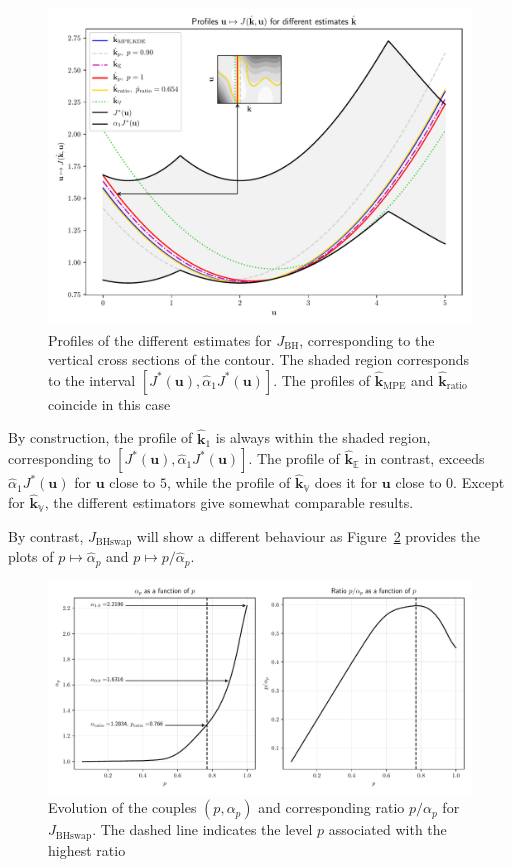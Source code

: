 \documentclass[preprint, 1p]{elsarticle}
\newcommand{\Ex}{\mathbb{E}}
\newcommand{\hatkmean}{\hat{\mathbf{k}}_{\Ex}}
\newcommand{\hatkvar}{\hat{\mathbf{k}}_{\mathbb{V}}}
\newcommand{\kest}{\hat{\mathbf{k}}}
\newcommand{\checkap}{{\alpha}_p}
\newcommand{\checka}{{\alpha}}
\newcommand{\checkk}{\mathbf{k}}
\newcommand{\JBH}{J_{\mathrm{BH}}}
\newcommand{\JBHS}{J_{\mathrm{BHswap}}}
\newlength{\onehalfcolumn}
\begin{document}
\begin{figure}[!h]
  \centering
\includegraphics[width=\onehalfcolumn]{Figures/FIG07.pdf}
\caption{Profiles of the different estimates for $\JBH$, corresponding to the vertical cross sections of the contour. The shaded region corresponds to the interval $[J^*(\mathbf{u}), \hat{\checka}_1 J^*(\mathbf{u})]$. The profiles of $\kest_{\mathrm{MPE}}$ and $\kest_{\mathrm{ratio}}$ coincide in this case}
\label{fig:profiles_branin}
\end{figure}

By construction, the profile of $\hat{\checkk}_1$ is always within the shaded region, corresponding to $[J^*(\mathbf{u}), \hat{\checka}_1 J^*(\mathbf{u})]$. The profile of $\hatkmean$ in contrast, exceeds $\hat{\checka}_1 J^*(\mathbf{u})$ for $\mathbf{u}$ close to $5$, while the profile of $\hatkvar$ does it for $\mathbf{u}$ close to $0$. Except for $\hatkvar$, the different estimators give somewhat comparable results.


By contrast, $\JBHS$ will show a different behaviour as Figure~\ref{fig:ratio_BHs} provides the plots of $p\mapsto \hat{\checka}_p$ and $p\mapsto p/\hat{\checka}_p$.

\begin{figure}[!h]
  \centering
\includegraphics[width=\onehalfcolumn]{Figures/FIG08.pdf}
\caption{Evolution of the couples $(p,\checkap)$ and corresponding ratio $p/\checkap$ for $\JBHS$. The dashed line indicates the level $p$ associated with the highest ratio}
\label{fig:ratio_BHs}
\end{figure}
\end{document}
